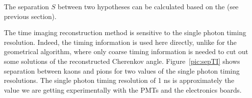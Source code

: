 The separation $S$ between two hypotheses can be calculated based on the \deltall (see previous section).

The time imaging reconstruction method is sensitive to the single photon timing resolution. Indeed, the timing information is used here directly, unlike for the geometrical algorithm, where only coarse timing information is needed to cut out some solutions of the reconstructed Cherenkov angle. Figure~\ref{pic:sepTI} shows separation between kaons and pions for two values of the single photon timing resolutions. The single photon timing resolution of 1 ns is approximately the value we are getting experimentally with the PMTs and the electronics boards.
